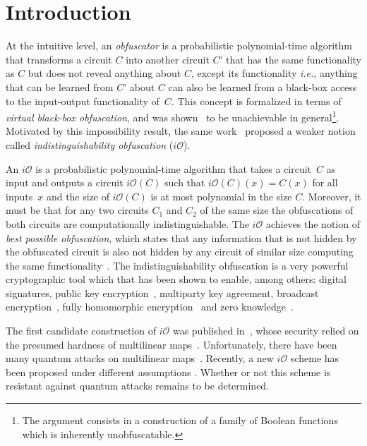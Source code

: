 \section{Introduction}
At the intuitive level, an \emph{obfuscator} is a probabilistic polynomial-time algorithm that  transforms a circuit $C$ into another circuit $C’$ that has the same functionality as $C$ but does not reveal anything about $C$, except its functionality \emph{i.e.}, anything that can be learned from $C’$ about $C$ can also be learned from a black-box access to the input-output functionality of~$C$. This concept is formalized in terms of \emph{virtual black-box obfuscation}, and was shown~\cite{BGI+12} to be unachievable in general\footnote{The argument consists in a construction of a family of Boolean functions which is inherently unobfuscatable.}. Motivated by this impossibility result, the same work~\cite{BGI+12} proposed a weaker notion called \emph{indistinguishability obfuscation} ($i\mathcal{O}$).

An $i\mathcal{O}$ is a probabilistic polynomial-time algorithm that takes a circuit~$C$ as  input and outputs a circuit $i\mathcal{O}(C)$ such that $i\mathcal{O}(C)(x)=C(x)$ for all inputs~$x$ and the size of $i\mathcal{O}(C)$ is at most polynomial in the size $C$. Moreover, it must be that for any two circuits $C_1$ and $C_2$ of the same size  the obfuscations of both circuits are computationally indistinguishable. The $i\mathcal{O}$ achieves the notion of \emph{best possible obfuscation}, which states that any information that is not hidden by the obfuscated circuit is also not hidden by any  circuit of similar size computing the same functionality~\cite{GR14}. The indistinguishability obfuscation is a very powerful cryptographic tool which that has been shown to enable, among others: digital signatures, public key encryption~\cite{SW14}, multiparty key agreement, broadcast encryption~\cite{BZ14}, fully homomorphic encryption~\cite{CLTV15} and zero knowledge~\cite{BP15}.

The first candidate construction of $i\mathcal{O}$ was published in~\cite{GGH+13}, whose security relied on the presumed hardness of multilinear maps~\cite{CLT13, LSS14, GGH15}. Unfortunately, there have been many quantum attacks on  multilinear maps~\cite{ABD16, CDPR16, CGH17}.  Recently, a new $i\mathcal{O}$ scheme has been proposed under  different assumptions \cite{AJL+19}. Whether or not this scheme is resistant against quantum attacks remains to be determined.

